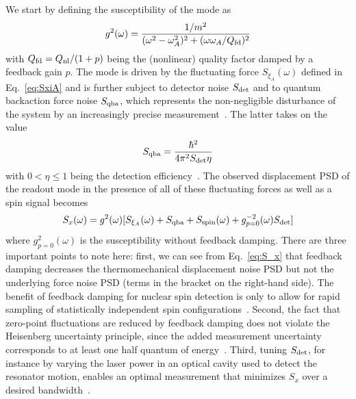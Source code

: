 We start by defining the susceptibility of the mode as
\begin{equation} \label{eq:susc_damped}
g^2(\omega) = \frac{1 / m^2}{(\omega^2 - \omega_A^2)^2 + (\omega \omega_A / Q_{\rm fd})^2}
\end{equation}
with $Q_{\rm fd} = Q_{\rm nl}/(1+p)$ being the (nonlinear) quality factor damped by a feedback gain $p$.
The mode is driven by the fluctuating force $S_{\xi_A}(\omega)$ defined in Eq.~\eqref{eq:SxiA} and is further subject to detector noise $S_{\rm det}$ and to quantum backaction force noise $S_{\rm qba}$, which represents the non-negligible disturbance of the system by an increasingly precise measurement~\cite{Courty_2001, Clerk_2010}. The latter takes on the value 
\begin{equation} \label{eq:S_ba}
S_{\rm qba} = \frac{\hbar^2}{4 \pi^2 S_{\rm det} \eta}
\end{equation}
with $0 < \eta \leq 1$ being the detection efficiency~\cite{Rossi_2018}. The observed displacement PSD of the readout mode in the presence of all of these fluctuating forces as well as a spin signal becomes~\cite{Poggio_2007, Rossi_2018}
\begin{equation} \label{eq:S_x}
S_x(\omega) = g^2(\omega)[S_{\xi_A}(\omega) + S_{\rm qba}  + S_{\rm spin}(\omega) + g_{p=0}^{-2}(\omega) S_{\rm det}]
\end{equation}
where $g_{p=0}^{2}(\omega)$ is the susceptibility without feedback damping. There are three important points to note here: first, we can see from Eq.~\eqref{eq:S_x} that feedback damping decreases the thermomechanical displacement noise PSD but not the underlying force noise PSD (terms in the bracket on the right-hand side). The benefit of feedback damping for nuclear spin detection is only to allow for rapid sampling of statistically independent spin configurations~\cite{Degen_2007}. Second, the fact that zero-point fluctuations are reduced by feedback damping does not violate the Heisenberg uncertainty principle, since the added measurement uncertainty corresponds to at least one half quantum of energy~\cite{Courty_2001, Rossi_2018}. Third, tuning $S_{\rm det}$, for instance by varying the laser power in an optical cavity used to detect the resonator motion, enables an optimal measurement that minimizes $S_x$ over a desired bandwidth~\cite{Clerk_2010}.

